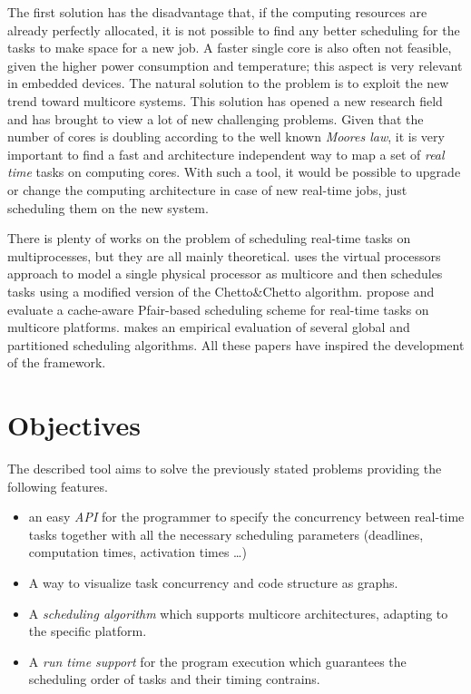 \documentclass[a4paper,12pt,oneside]{book}
\begin{document}
The first solution has the disadvantage that, if the computing resources are already perfectly allocated, it is not possible to find any better scheduling for the tasks to make space for a new job. A faster single core is also often not feasible, given the higher power consumption and temperature; this aspect is very relevant in embedded devices. 
The natural solution to the problem is to exploit the new trend toward multicore systems. This solution has opened a new research field and has brought to view a lot of new challenging problems. Given that the number of cores is doubling according to the well known \emph{Moores law}, it is very important to find a fast and architecture independent way to map a set of \emph{real time} tasks on computing cores. With such a tool, it would be possible to upgrade or change the computing architecture in case of new real-time jobs, just scheduling them on the new system.

There is plenty of works on the problem of scheduling real-time tasks on multiprocesses, but they are all mainly theoretical. \cite{bbw2} uses the virtual processors approach to model a single physical processor as multicore and then schedules tasks using a modified version of the Chetto\&Chetto algorithm. \cite{real1} propose and evaluate a cache-aware Pfair-based scheduling scheme for real-time tasks on multicore platforms. \cite{real2} makes an empirical evaluation of several global and partitioned scheduling algorithms. All these papers have inspired the development of the framework.



\section{Objectives}

The described tool aims to solve the previously stated problems providing the following features.

\begin{itemize}
\item{an easy \emph{API} for the programmer to specify the concurrency between real-time tasks together with all the necessary scheduling parameters (deadlines, computation times, activation times \dots)}
\item{A way to visualize task concurrency and code structure as graphs.}
\item{A \emph{scheduling algorithm} which supports multicore architectures, adapting to the specific platform.}
\item{A \emph{run time support} for the program execution which guarantees the scheduling order of tasks and their timing contrains.}
\end{itemize}
\end{document}
